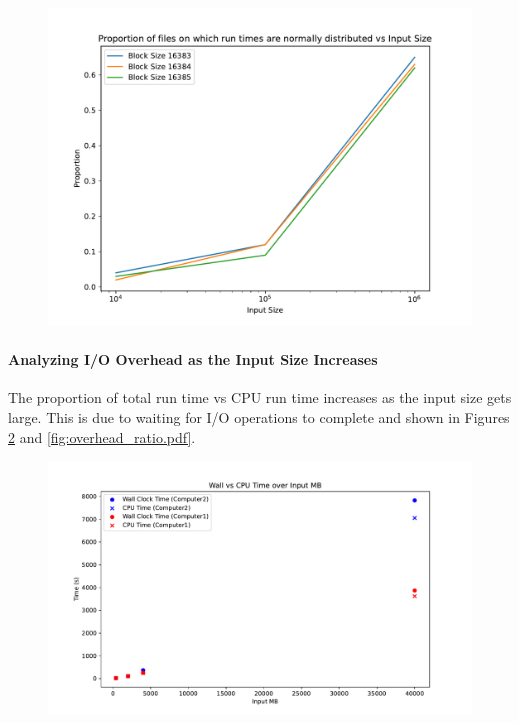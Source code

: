 \documentclass[twocolumn]{article}
\begin{document}
\begin{figure}[htb]
    \begin{minipage}{0.475 \textwidth}
        \centering
        \includegraphics[width=\textwidth]{./res/plot_normality.pdf}
        \caption{}
        \label{fig:plot_normality.pdf}
    \end{minipage}
\end{figure}

\paragraph*{Analyzing I/O Overhead as the Input Size Increases}
The proportion of total run time vs CPU run time increases as the input size gets large. This is due to waiting for I/O operations to complete and shown in Figures
\ref{fig:overhead.pdf} and \ref{fig:overhead_ratio.pdf}.

\begin{figure}[htb]
    \begin{minipage}{0.475 \textwidth}
        \centering
        \includegraphics[width=\textwidth]{./res/overhead.pdf}
        \caption{}
        \label{fig:overhead.pdf}
    \end{minipage}
\end{figure}
\end{document}

